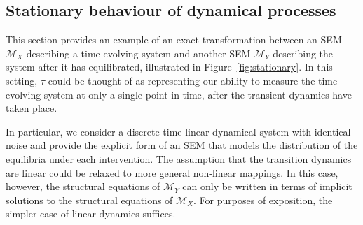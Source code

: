 \subsection{Stationary behaviour of dynamical processes}\label{subsec:stationary}

This section provides an example of an exact transformation between an SEM $\mathcal{M}_X$ describing a time-evolving system and another SEM $\mathcal{M}_Y$ describing the system after it has equilibrated, illustrated in Figure~\ref{fig:stationary}. 
In this setting, $\tau$ could be thought of as representing our ability to measure the time-evolving system at only a single point in time, after the transient dynamics have taken place.

In particular, we consider a discrete-time linear dynamical system with identical noise and provide the explicit form of an SEM that models the distribution of the equilibria under each intervention.
The assumption that the transition dynamics are linear could be relaxed to more general non-linear mappings. 
In this case, however, the structural equations of $\mathcal{M}_Y$ can only be written in terms of implicit solutions to the structural equations of $\mathcal{M}_X$. 
For purposes of exposition, the simpler case of linear dynamics suffices.

